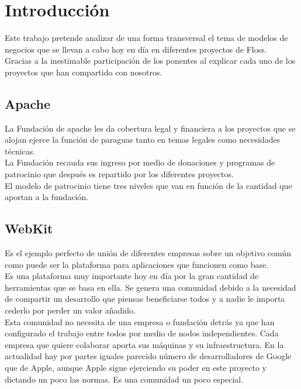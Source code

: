 \documentclass[12pt]{article} %
\begin{document}
\tableofcontents %

\newpage %


\section{Introducción} %

Este trabajo pretende analizar de una forma transversal el tema de modelos de negocios que se llevan a cabo hoy en día en diferentes proyectos de Floss. \\ Gracias a la inestimable participación de los ponentes al explicar cada uno de los proyectos que han compartido con nosotros.

\subsection{Apache} %

La Fundación de apache les da cobertura legal y financiera a los proyectos que se alojan ejerce la función de paraguas tanto en temas legales como necesidades técnicas. \\ La Fundación recauda sus ingreso por medio de donaciones y programas de patrocinio que después es repartido por los diferentes proyectos.\\El modelo de patrocinio tiene tres niveles que van en función de la cantidad que aportan a la fundación.

\subsection{WebKit} %

Es el ejemplo perfecto de unión de diferentes empresas sobre un objetivo común como puede ser la plataforma para aplicaciones que funcionen como base.\\Es una plataforma muy importante hoy en día por la gran cantidad de herramientas que se basa en ella. Se genera una comunidad debido a la necesidad de compartir un desarrollo que piensas beneficiarse todos y a nadie le importa cederlo por perder un valor añadido.\\Esta comunidad no necesita de una empresa o fundación detrás ya que han configurado el trabajo entre todos por medio de nodos independientes. Cada empresa que quiere colaborar aporta sus máquinas y su infraestructura. En la actualidad hay por partes iguales parecido número de desarrolladores de Google que de Apple, aunque Apple sigue ejerciendo su poder en este proyecto y dictando un poco las normas. Es una comunidad un poco especial.
\end{document}
